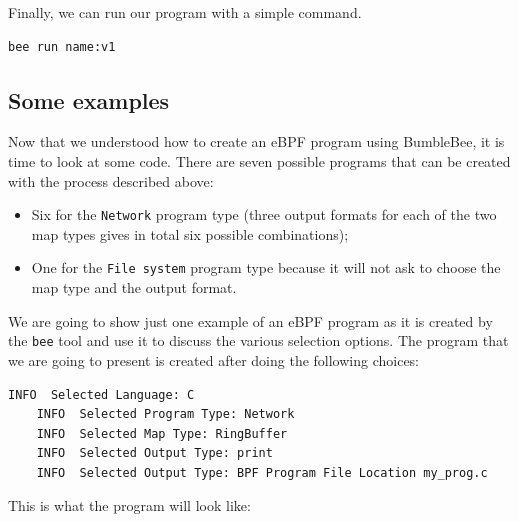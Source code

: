 Finally, we can run our program with a simple command.

\begin{lstlisting}[style=commandline, language=bash, caption={bee run command}]
	bee run name:v1
\end{lstlisting}

\subsection{Some examples}

Now that we understood how to create an eBPF program using BumbleBee, it is time to look at some code.
There are seven possible programs that can be created with the process described above:

\begin{itemize}
	\item 
		Six for the \colorbox{backcolour}{\lstinline[style=highlight, language=bash]|Network|} program type (three output formats for each of the two map types gives in total six possible combinations);
	\item 
		One for the \colorbox{backcolour}{\lstinline[style=highlight, language=bash]|File system|} program type because it will not ask to choose the map type and the output format.
\end{itemize}

We are going to show just one example of an eBPF program as it is created by the \colorbox{backcolour}{\lstinline[style=highlight, language=bash]|bee|} tool and use it to discuss the various selection options.
The program that we are going to present  is created after doing the following choices:

\begin{lstlisting}[style=commandline, language=bash, caption={bee choices for first program}]
	INFO  Selected Language: C
	INFO  Selected Program Type: Network
	INFO  Selected Map Type: RingBuffer
	INFO  Selected Output Type: print
	INFO  Selected Output Type: BPF Program File Location my_prog.c
\end{lstlisting}

This is what the program will look like:

